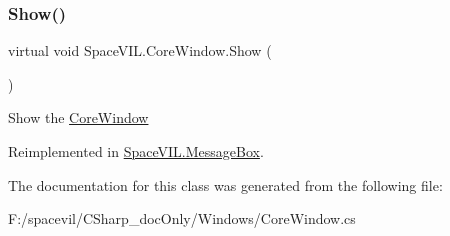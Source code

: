 \mbox{\label{class_space_v_i_l_1_1_core_window_a6f25e26e98c54d56d93b0abfc88af3c0}} 
\subsubsection{\texorpdfstring{Show()}{Show()}}
{\footnotesize\ttfamily virtual void Space\+V\+I\+L.\+Core\+Window.\+Show (\begin{DoxyParamCaption}{ }\end{DoxyParamCaption})\hspace{0.3cm}{\ttfamily [virtual]}}



Show the \mbox{\hyperlink{class_space_v_i_l_1_1_core_window}{Core\+Window}} 



Reimplemented in \mbox{\hyperlink{class_space_v_i_l_1_1_message_box_a2d2963f79fd8eb73c03872eee52b4331}{Space\+V\+I\+L.\+Message\+Box}}.



The documentation for this class was generated from the following file\+:\begin{DoxyCompactItemize}
\item 
F\+:/spacevil/\+C\+Sharp\+\_\+doc\+Only/\+Windows/Core\+Window.\+cs\end{DoxyCompactItemize}
